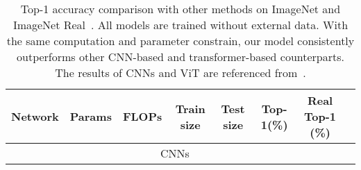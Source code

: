 \documentclass[10pt,twocolumn,letterpaper]{article}
\begin{document}
\begin{table*}
    \centering
    \caption{Top-1 accuracy comparison with other methods on ImageNet \cite{deng2009imagenet}
    and ImageNet Real~\cite{beyer2020we}. All models are trained without external data. 
    With the same computation and parameter constrain, our model consistently outperforms
    other CNN-based and transformer-based counterparts. The results of CNNs and ViT are referenced from~\cite{touvron2021going}.}
    \label{tab:sota}
    \def \mysp {\hspace{7pt}}
    \centering \scalebox{1.0}
    {\small 
    \begin{tabular}{@{\ }lccccccc}
    \toprule
    Network  & Params & FLOPs & Train size & Test size  &  Top-1(\%)  & Real Top-1 (\%) \\
    \toprule
    \multicolumn{7}{c}{CNNs}\\
    \midrule


\end{tabular}}
\end{table*}
\end{document}
